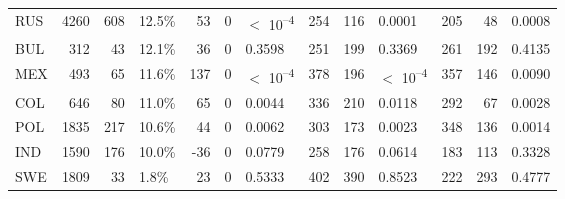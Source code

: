 \begin{tabular}[t]{lrrlrrlrrlrrl}
RUS & 4260 & 608 & 12.5\% & 53 & 0 & $<$ 10\textsuperscript{--4} & 254 & 116 & 0.0001 & 205 & 48 & 0.0008\\
BUL & 312 & 43 & 12.1\% & 36 & 0 & 0.3598 & 251 & 199 & 0.3369 & 261 & 192 & 0.4135\\
MEX & 493 & 65 & 11.6\% & 137 & 0 & $<$ 10\textsuperscript{--4} & 378 & 196 & $<$ 10\textsuperscript{--4} & 357 & 146 & 0.0090\\
COL & 646 & 80 & 11.0\% & 65 & 0 & 0.0044 & 336 & 210 & 0.0118 & 292 & 67 & 0.0028\\
POL & 1835 & 217 & 10.6\% & 44 & 0 & 0.0062 & 303 & 173 & 0.0023 & 348 & 136 & 0.0014\\
IND & 1590 & 176 & 10.0\% & -36 & 0 & 0.0779 & 258 & 176 & 0.0614 & 183 & 113 & 0.3328\\
SWE & 1809 & 33 & 1.8\% & 23 & 0 & 0.5333 & 402 & 390 & 0.8523 & 222 & 293 & 0.4777\\
\bottomrule
\end{tabular}
